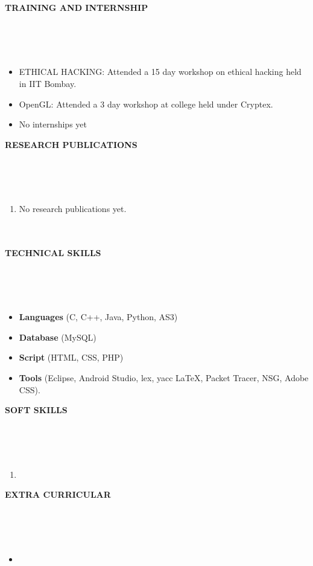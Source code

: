 \documentclass[a4paper,10pt]{article}
\newcommand{\lsep}{-0.5cm}
\newcommand{\resheading}[1]{{\small \colorbox{mygrey}{\begin{minipage}{0.975\textwidth}{\textbf{#1 \vphantom{p\^{E}}}}\end{minipage}}}}
\begin{document}
\resheading{\textbf{TRAINING AND INTERNSHIP} }\\[\lsep]
\\ \\
\begin{itemize}
					\item ETHICAL HACKING: Attended a 15 day workshop on ethical hacking held in IIT Bombay.
					\item OpenGL:
					Attended a 3 day workshop at college held under Cryptex.
					\item No internships yet
\end{itemize}

\resheading{\textbf{RESEARCH PUBLICATIONS} }\\[\lsep]
\\ \\
\begin{enumerate}
		\item No research publications yet. \\ \\ \\
\end{enumerate}

\resheading{\textbf{TECHNICAL SKILLS} }\\[\lsep]
\\ \\
\begin{itemize}
	\item \noindent \textbf{Languages} (C, C++, Java, Python, AS3)
	\item \noindent \textbf{Database} (MySQL)
	\item \noindent \textbf{Script} (HTML, CSS, PHP) 
	\item \noindent \textbf{Tools} (Eclipse, Android Studio, lex, yacc \LaTeX, Packet Tracer, NSG, Adobe CSS).
	
\end{itemize}

\resheading{\textbf{SOFT SKILLS} }\\[\lsep]
\\ \\
\begin{enumerate}
	\item
\end{enumerate}

\resheading{\textbf{EXTRA CURRICULAR} }\\[\lsep]
\\ \\
\begin{itemize}
	\item
\end{itemize}
\end{document}
